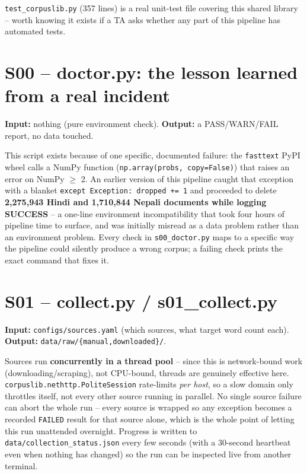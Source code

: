 \documentclass[11pt]{report}
\begin{document}
\begin{notebox}
\texttt{test\_corpuslib.py} (357 lines) is a real unit-test file covering
this shared library -- worth knowing it exists if a TA asks whether any
part of this pipeline has automated tests.
\end{notebox}

\section{S00 -- doctor.py: the lesson learned from a real incident}

\textbf{Input:} nothing (pure environment check). \textbf{Output:} a
PASS/WARN/FAIL report, no data touched.

This script exists because of one specific, documented failure: the
\texttt{fasttext} PyPI wheel calls a NumPy function
(\texttt{np.array(probs, copy=False)}) that raises an error on NumPy
$\geq$ 2. An earlier version of this pipeline caught that exception with
a blanket \texttt{except Exception: dropped += 1} and proceeded to delete
\textbf{2,275,943 Hindi and 1,710,844 Nepali documents while logging
SUCCESS} -- a one-line environment incompatibility that took four hours
of pipeline time to surface, and was initially misread as a data problem
rather than an environment problem. Every check in \texttt{s00\_doctor.py}
maps to a specific way the pipeline could silently produce a wrong
corpus; a failing check prints the exact command that fixes it.

\section{S01 -- collect.py / s01\_collect.py}

\textbf{Input:} \texttt{configs/sources.yaml} (which sources, what target
word count each). \textbf{Output:} \texttt{data/raw/\{manual,downloaded\}/}.

Sources run \textbf{concurrently in a thread pool} -- since this is
network-bound work (downloading/scraping), not CPU-bound, threads are
genuinely effective here. \texttt{corpuslib.nethttp.PoliteSession}
rate-limits \textit{per host}, so a slow domain only throttles itself,
not every other source running in parallel. No single source failure can
abort the whole run -- every source is wrapped so any exception becomes a
recorded \texttt{FAILED} result for that source alone, which is the whole
point of letting this run unattended overnight. Progress is written to
\texttt{data/collection\_status.json} every few seconds (with a 30-second
heartbeat even when nothing has changed) so the run can be inspected live
from another terminal.
\end{document}
